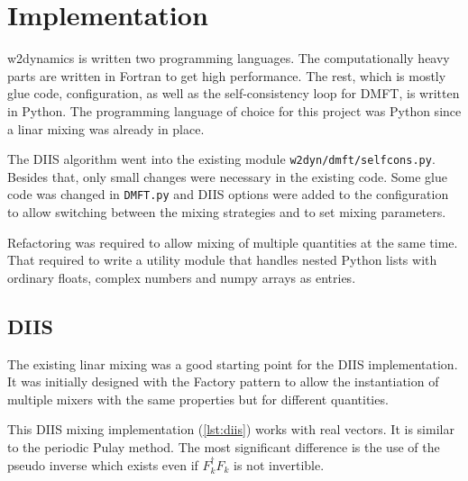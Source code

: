 \chapter{Implementation}
\label{ch:impl}
w2dynamics\cite{w2dyn}\cite{w2dyn_ref} is written two programming languages. The computationally heavy parts are written in Fortran to get high performance. The rest, which is mostly glue code, configuration, as well as the self-consistency loop for DMFT, is written in Python. The programming language of choice for this project was Python since a linar mixing was already in place.

The DIIS algorithm went into the existing module \texttt{w2dyn/dmft/selfcons.py}. Besides that, only small changes were necessary in the existing code. Some glue code was changed in \texttt{DMFT.py} and DIIS options were added to the configuration to allow switching between the mixing strategies and to set mixing parameters.

Refactoring was required to allow mixing of multiple quantities at the same time. That required to write a utility module that handles nested Python lists with ordinary floats, complex numbers and numpy arrays as entries.

\section{DIIS}
The existing linar mixing was a good starting point for the DIIS implementation. It was initially designed with the Factory pattern to allow the instantiation of multiple mixers with the same properties but for different quantities.

This DIIS mixing implementation (\ref{lst:diis}) works with real vectors. It is similar to the periodic Pulay method\cite{diis_periodic}. The most significant difference is the use of the pseudo inverse which exists even if \(F_k^\dagger F_k\) is not invertible.


